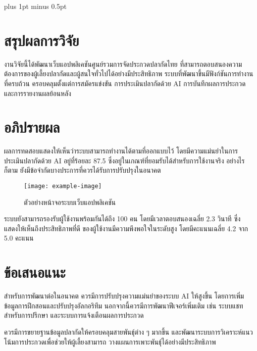 
\clearpage
\thispagestyle{plain}

\begingroup
\fontsize{16pt}{19.2pt}\selectfont
\justifying
\XeTeXlinebreakskip=0pt plus 1pt minus 0.5pt
\setlength{\parindent}{1.5cm}
\setlength{\parskip}{0pt}

\section*{สรุปผลการวิจัย}

\indent งานวิจัยนี้ได้พัฒนาเว็บแอปพลิเคชันศูนย์รวมการจัดประกวดปลากัดไทย
ที่สามารถตอบสนองความต้องการของผู้เลี้ยงปลากัดและผู้สนใจทั่วไปได้อย่างมีประสิทธิภาพ
ระบบที่พัฒนาขึ้นมีฟังก์ชันการทำงานที่ครบถ้วน ครอบคลุมตั้งแต่การสมัครแข่งขัน
การประเมินปลากัดด้วย AI การบันทึกผลการประกวด และการรายงานผลย้อนหลัง

\section*{อภิปรายผล}

\indent ผลการทดสอบแสดงให้เห็นว่าระบบสามารถทำงานได้ตามที่ออกแบบไว้
โดยมีความแม่นยำในการประเมินปลากัดด้วย AI อยู่ที่ร้อยละ 87.5
ซึ่งอยู่ในเกณฑ์ที่ยอมรับได้สำหรับการใช้งานจริง อย่างไรก็ตาม
ยังมีข้อจำกัดบางประการที่ควรได้รับการปรับปรุงในอนาคต

\begin{figure}[h]
\centering
\texttt{[image: example-image]}
\caption{ตัวอย่างหน้าจอระบบเว็บแอปพลิเคชัน}
\end{figure}

\indent ระบบยังสามารถรองรับผู้ใช้งานพร้อมกันได้ถึง 100 คน
โดยมีเวลาตอบสนองเฉลี่ย 2.3 วินาที ซึ่งแสดงให้เห็นถึงประสิทธิภาพที่ดี
ของผู้ใช้งานมีความพึงพอใจในระดับสูง โดยมีคะแนนเฉลี่ย 4.2 จาก 5.0 คะแนน

\section*{ข้อเสนอแนะ}

\indent สำหรับการพัฒนาต่อในอนาคต ควรมีการปรับปรุงความแม่นยำของระบบ AI
ให้สูงขึ้น โดยการเพิ่มข้อมูลการฝึกสอนและปรับปรุงอัลกอริทึม
นอกจากนี้ควรมีการพัฒนาฟีเจอร์เพิ่มเติม เช่น ระบบแชทสำหรับการปรึกษา
และระบบการแจ้งเตือนผลการประกวด

\indent ควรมีการขยายฐานข้อมูลปลากัดให้ครอบคลุมสายพันธุ์ต่าง ๆ มากขึ้น
และพัฒนาระบบการวิเคราะห์แนวโน้มการประกวดเพื่อช่วยให้ผู้เลี้ยงสามารถ
วางแผนการเพาะพันธุ์ได้อย่างมีประสิทธิภาพ

\par\endgroup
\clearpage

